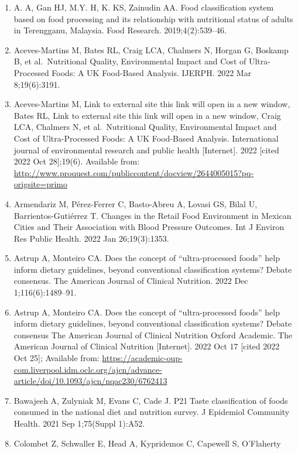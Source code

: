 \documentclass[
]{article}
\providecommand{\tightlist}{%
  \setlength{\itemsep}{0pt}\setlength{\parskip}{0pt}}
\begin{document}
\begin{enumerate}
\def\labelenumi{\arabic{enumi}.}
\tightlist
\item
  A. A, Gan HJ, M.Y. H, K. KS, Zainudin AA. Food classification system
  based on food processing and its relationship with nutritional status
  of adults in Terengganu, Malaysia. Food Research. 2019;4(2):539--46.
\item
  Aceves-Martins M, Bates RL, Craig LCA, Chalmers N, Horgan G, Boskamp
  B, et al.~Nutritional Quality, Environmental Impact and Cost of
  Ultra-Processed Foods: A UK Food-Based Analysis. IJERPH. 2022 Mar
  8;19(6):3191.
\item
  Aceves-Martins M, Link to external site this link will open in a new
  window, Bates RL, Link to external site this link will open in a new
  window, Craig LCA, Chalmers N, et al.~Nutritional Quality,
  Environmental Impact and Cost of Ultra-Processed Foods: A UK
  Food-Based Analysis. International journal of environmental research
  and public health {[}Internet{]}. 2022 {[}cited 2022 Oct 28{]};19(6).
  Available from:
  \url{http://www.proquest.com/publiccontent/docview/2644005015?pq-origsite=primo}
\item
  Armendariz M, Pérez-Ferrer C, Basto-Abreu A, Lovasi GS, Bilal U,
  Barrientos-Gutiérrez T. Changes in the Retail Food Environment in
  Mexican Cities and Their Association with Blood Pressure Outcomes. Int
  J Environ Res Public Health. 2022 Jan 26;19(3):1353.
\item
  Astrup A, Monteiro CA. Does the concept of ``ultra-processed foods''
  help inform dietary guidelines, beyond conventional classification
  systems? Debate consensus. The American Journal of Clinical Nutrition.
  2022 Dec 1;116(6):1489--91.
\item
  Astrup A, Monteiro CA. Does the concept of ``ultra-processed foods''
  help inform dietary guidelines, beyond conventional classification
  systems? Debate consensus \textbar{} The American Journal of Clinical
  Nutrition \textbar{} Oxford Academic. The American Journal of Clinical
  Nutrition {[}Internet{]}. 2022 Oct 17 {[}cited 2022 Oct 25{]};
  Available from:
  \url{https://academic-oup-com.liverpool.idm.oclc.org/ajcn/advance-article/doi/10.1093/ajcn/nqac230/6762413}
\item
  Bawajeeh A, Zulyniak M, Evans C, Cade J. P21 Taste classification of
  foods consumed in the national diet and nutrition survey. J Epidemiol
  Community Health. 2021 Sep 1;75(Suppl 1):A52.
\item
  Colombet Z, Schwaller E, Head A, Kypridemos C, Capewell S, O'Flaherty

\end{enumerate}
\end{document}
